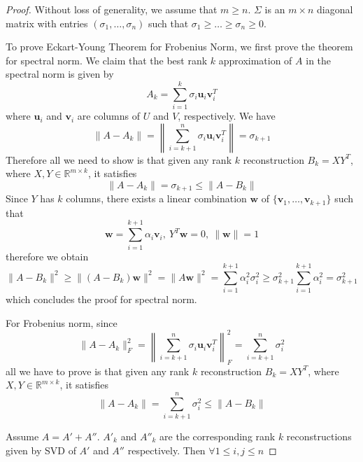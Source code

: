 \documentclass[../book-template.tex]{subfiles}
\begin{document}
\begin{proof}
Without loss of generality, we assume that $m\geq n$. $\Sigma$ is an $m\times n$ diagonal matrix with entries $(\sigma_1,\dots,\sigma_n)$ such that $\sigma_1\geq\dots\geq \sigma_n\geq 0$.
\par To prove Eckart-Young Theorem for Frobenius Norm, we first prove the theorem for spectral norm. We claim that the best rank $k$ approximation of $A$ in the spectral norm is given by
\begin{equation*}
    A_k = \sum_{i=1}^{k}\sigma_i\bm{u}_i\bm{v}^T_i
\end{equation*}
where $\bm{u}_i$ and $\bm{v}_i$ are columns of $U$ and $V$, respectively. We have
\begin{equation*}
    \|A-A_k\| = \left\|\sum_{i=k+1}^{n}\sigma_i\bm{u}_i\bm{v}^T_i\right\| = \sigma_{k+1}
\end{equation*}
Therefore all we need to show is that given any rank $k$ reconstruction $B_k=XY^T$, where $X,Y\in \mathbb{R}^{m\times k}$, it satisfies
\begin{equation*}
     \|A-A_k\| =\sigma_{k+1}\leq \|A-B_k\|
\end{equation*}
Since $Y$ has $k$ columns, there exists a linear combination $\bm{w}$ of $\{\bm{v}_1,\dots,\bm{v}_{k+1}\}$ such that
\begin{equation*}
    \bm{w} = \sum_{i=1}^{k+1}\alpha_i\bm{v}_i,\ Y^T\bm{w}=0,\ \|\bm{w}\|=1
\end{equation*}
therefore we obtain
\begin{equation*}
    \|A-B_k\|^2\geq \|(A-B_k)\bm{w}\|^2 = \|A\bm{w}\|^2 = \sum_{i=1}^{k+1}\alpha_i^2\sigma_i^2\geq \sigma_{k+1}^2\sum_{i=1}^{k+1}\alpha_i^2 = \sigma_{k+1}^2
\end{equation*}
which concludes the proof for spectral norm.
\par For Frobenius norm, since
\begin{equation*}
    \|A-A_k\|_F^2= \left\|\sum_{i=k+1}^{n}\sigma_i\bm{u}_i\bm{v}^T_i\right\|_F^2 = \sum_{i=k+1}^{n}\sigma_i^2
\end{equation*}
all we have to prove is that given any rank $k$ reconstruction $B_k=XY^T$, where $X,Y\in \mathbb{R}^{m\times k}$, it satisfies
\begin{equation*}
     \|A-A_k\| =\sum_{i=k+1}^{n}\sigma_i^2\leq \|A-B_k\|
\end{equation*}
\par Assume $A=A'+A''$. $A'_k$ and $A''_k$ are the corresponding rank $k$ reconstructions given by SVD of $A'$ and $A''$ respectively. Then $\forall 1\leq i,j\leq n$

\end{proof}
\end{document}
